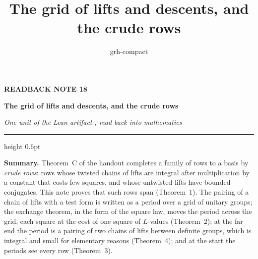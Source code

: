 \documentclass[11pt,a4paper]{article}
\title{The grid of lifts and descents, and the crude rows}
\author{grh-compact}
\date{}
\theoremstyle{plainx}
\theoremstyle{uprightx}
\begin{document}
\color{ink}

{\raggedright
{\sffamily\bfseries\fontsize{7.2}{9}\selectfont\color{leancol}READBACK NOTE 18\par}
\vspace{5pt}
{\fontsize{21.5}{25.5}\selectfont\bfseries The grid of lifts and descents, and the crude rows\par}
\vspace{5pt}
{\fontsize{12.4}{16}\selectfont\itshape\color{inksoft} One unit of the Lean artifact \ArtifactName, read back into
mathematics\par}}
\vspace{8pt}
{\color{rulegrey}\hrule height 0.6pt}
\vspace{7pt}
\thispagestyle{empty}

\textbf{Summary.} Theorem~C of the handout completes a family of rows to a basis by \emph{crude rows}: rows whose
twisted chains of lifts are integral after multiplication by a constant that costs few squares, and whose
untwisted lifts have bounded conjugates. This note proves that such rows span (Theorem~1). The pairing of a
chain of lifts with a test form is written as a period over a grid of unitary groups; the exchange theorem, in
the form of the square law, moves the period across the grid, each square at the cost of one square of
$L$-values (Theorem~2); at the far end the period is a pairing of two chains of lifts between definite groups,
which is integral and small for elementary reasons (Theorem~4); and at the start the periods see every row
(Theorem~3).
\end{document}
